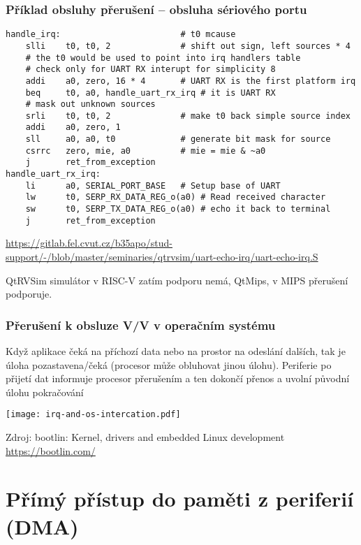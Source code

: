 \documentclass{beamer}
\begin{document}
\begin{frame}[fragile]
\frametitle{Příklad obsluhy přerušení -- obsluha sériového portu}

\begin{verbatim}
handle_irq:                        # t0 mcause
    slli    t0, t0, 2              # shift out sign, left sources * 4
    # the t0 would be used to point into irq handlers table
    # check only for UART RX interupt for simplicity 8
    addi    a0, zero, 16 * 4       # UART RX is the first platform irq
    beq     t0, a0, handle_uart_rx_irq # it is UART RX
    # mask out unknown sources
    srli    t0, t0, 2              # make t0 back simple source index
    addi    a0, zero, 1
    sll     a0, a0, t0             # generate bit mask for source
    csrrc   zero, mie, a0          # mie = mie & ~a0
    j       ret_from_exception
handle_uart_rx_irq:
    li      a0, SERIAL_PORT_BASE   # Setup base of UART
    lw      t0, SERP_RX_DATA_REG_o(a0) # Read received character
    sw      t0, SERP_TX_DATA_REG_o(a0) # echo it back to terminal
    j       ret_from_exception
\end{verbatim}

\tiny

\url{https://gitlab.fel.cvut.cz/b35apo/stud-support/-/blob/master/seminaries/qtrvsim/uart-echo-irq/uart-echo-irq.S}

QtRVSim simulátor v RISC-V zatím podporu nemá, QtMips, v MIPS přerušení podporuje.

\end{frame}

\begin{frame}
\frametitle{Přerušení k obsluze V/V v operačním systému}

Když aplikace čeká na příchozí data nebo na prostor na odeslání dalších, tak je úloha pozastavena/čeká (procesor může obluhovat jinou úlohu).
Periferie po přijetí dat informuje procesor přerušením a ten dokončí přenos a uvolní původní úlohu pokračování

\begin{center}
  \texttt{[image: irq-and-os-intercation.pdf]}
\end{center}

\tiny

Zdroj: bootlin: Kernel, drivers and embedded Linux development \url{https://bootlin.com/}

\end{frame}

\section{Přímý přístup do paměti z periferií (DMA)}
\end{document}
